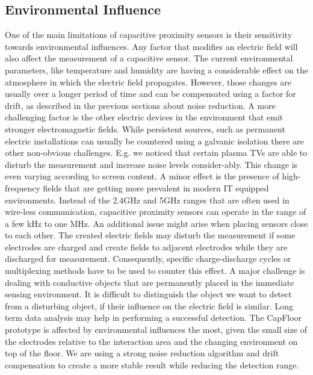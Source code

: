 \subsection{Environmental Influence}
One of the main limitations of capacitive proximity sensors is their sensitivity towards environmental influences. Any factor that modifies an electric field will also affect the measurement of a capacitive sensor. The current environmental parameters, like temperature and humidity are having a considerable effect on the atmosphere in which the electric field propagates. However, those changes are usually over a longer period of time and can be compensated using a factor for drift, as described in the previous sections about noise reduction. A more challenging factor is the other electric devices in the environment that emit stronger electromagnetic fields. While persistent sources, such as permanent electric installations can usually be countered using a galvanic isolation there are other non-obvious challenges. E.g. we noticed that certain plasma TVs are able to disturb the measurement and increase noise levels consider-ably. This change is even varying according to screen content. A minor effect is the presence of high-frequency fields that are getting more prevalent in modern IT equipped environments. Instead of the 2.4GHz and 5GHz ranges that are often used in wire-less communication, capacitive proximity sensors can operate in the range of a few kHz to one MHz. 
An additional issue might arise when placing sensors close to each other. The created electric fields may disturb the measurement if some electrodes are charged and create fields to adjacent electrodes while they are discharged for measurement. Consequently, specific charge-discharge cycles or multiplexing methods have to be used to counter this effect. 
A major challenge is dealing with conductive objects that are permanently placed in the immediate sensing environment. It is difficult to distinguish the object we want to detect from a disturbing object, if their influence on the electric field is similar. Long term data analysis may help in performing a successful detection.
The CapFloor prototype is affected by environmental influences the most, given the small size of the electrodes relative to the interaction area and the changing environment on top of the floor. We are using a strong noise reduction algorithm and drift compensation to create a more stable result while reducing the detection range.
